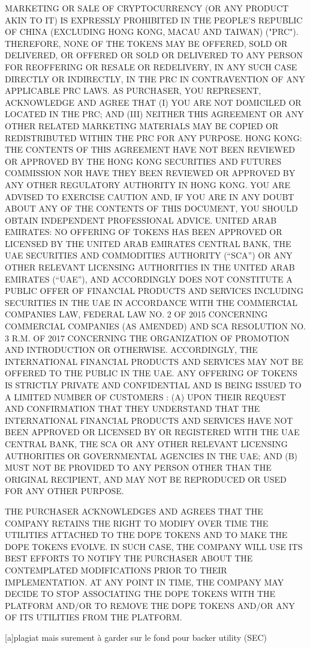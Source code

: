 ﻿\documentclass[a4paper]{article}
\begin{document}
MARKETING OR SALE OF CRYPTOCURRENCY (OR ANY PRODUCT AKIN TO IT) IS EXPRESSLY PROHIBITED IN THE PEOPLE'S REPUBLIC OF CHINA (EXCLUDING HONG KONG, MACAU AND TAIWAN) ("PRC"). THEREFORE, NONE OF THE TOKENS MAY BE OFFERED, SOLD OR DELIVERED, OR OFFERED OR SOLD OR DELIVERED TO ANY PERSON FOR REOFFERING OR RESALE OR REDELIVERY, IN ANY SUCH CASE DIRECTLY OR INDIRECTLY, IN THE PRC IN CONTRAVENTION OF ANY APPLICABLE PRC LAWS. AS PURCHASER, YOU REPRESENT, ACKNOWLEDGE AND AGREE THAT (I) YOU ARE NOT DOMICILED OR LOCATED IN THE PRC; AND (III) NEITHER THIS AGREEMENT OR ANY OTHER RELATED MARKETING MATERIALS MAY BE COPIED OR REDISTRIBUTED WITHIN THE PRC FOR ANY PURPOSE.
HONG KONG: THE CONTENTS OF THIS AGREEMENT HAVE NOT BEEN REVIEWED OR APPROVED BY THE HONG KONG SECURITIES AND FUTURES COMMISSION NOR HAVE THEY BEEN REVIEWED OR APPROVED BY ANY OTHER REGULATORY AUTHORITY IN HONG KONG. YOU ARE ADVISED TO EXERCISE CAUTION AND, IF YOU ARE IN ANY DOUBT ABOUT ANY OF THE CONTENTS OF THIS DOCUMENT, YOU SHOULD OBTAIN INDEPENDENT PROFESSIONAL ADVICE.
UNITED ARAB EMIRATES: NO OFFERING OF TOKENS HAS BEEN APPROVED OR LICENSED BY THE UNITED ARAB EMIRATES CENTRAL BANK, THE UAE SECURITIES AND COMMODITIES AUTHORITY (“SCA”) OR ANY OTHER RELEVANT LICENSING AUTHORITIES IN THE UNITED ARAB EMIRATES (“UAE”), AND ACCORDINGLY DOES NOT CONSTITUTE A PUBLIC OFFER OF FINANCIAL PRODUCTS AND SERVICES INCLUDING SECURITIES IN THE UAE IN ACCORDANCE WITH THE COMMERCIAL COMPANIES LAW, FEDERAL LAW NO. 2 OF 2015 CONCERNING COMMERCIAL COMPANIES (AS AMENDED) AND SCA RESOLUTION NO. 3 R.M. OF 2017 CONCERNING THE ORGANIZATION OF PROMOTION AND INTRODUCTION OR OTHERWISE. ACCORDINGLY, THE INTERNATIONAL FINANCIAL PRODUCTS AND SERVICES MAY NOT BE OFFERED TO THE PUBLIC IN THE UAE. ANY OFFERING OF TOKENS IS STRICTLY PRIVATE AND CONFIDENTIAL AND IS BEING ISSUED TO A LIMITED NUMBER OF CUSTOMERS : (A) UPON THEIR REQUEST AND CONFIRMATION THAT THEY UNDERSTAND THAT THE INTERNATIONAL FINANCIAL PRODUCTS AND SERVICES HAVE NOT BEEN APPROVED OR LICENSED BY OR REGISTERED WITH THE UAE CENTRAL BANK, THE SCA OR ANY OTHER RELEVANT LICENSING AUTHORITIES OR GOVERNMENTAL AGENCIES IN THE UAE; AND (B) MUST NOT BE PROVIDED TO ANY PERSON OTHER THAN THE ORIGINAL RECIPIENT, AND MAY NOT BE REPRODUCED OR USED FOR ANY OTHER PURPOSE.
 
THE PURCHASER ACKNOWLEDGES AND AGREES THAT THE COMPANY RETAINS THE RIGHT TO MODIFY OVER TIME THE UTILITIES ATTACHED TO THE DOPE TOKENS AND TO MAKE THE DOPE TOKENS EVOLVE. IN SUCH CASE, THE COMPANY WILL USE ITS BEST EFFORTS TO NOTIFY THE PURCHASER ABOUT THE CONTEMPLATED MODIFICATIONS PRIOR TO THEIR IMPLEMENTATION. AT ANY POINT IN TIME, THE COMPANY MAY DECIDE TO STOP ASSOCIATING THE DOPE TOKENS WITH THE PLATFORM AND/OR TO REMOVE THE DOPE TOKENS AND/OR ANY OF ITS UTILITIES FROM THE PLATFORM.


[a]plagiat mais surement à garder sur le fond pour backer utility (SEC)
\end{document}
